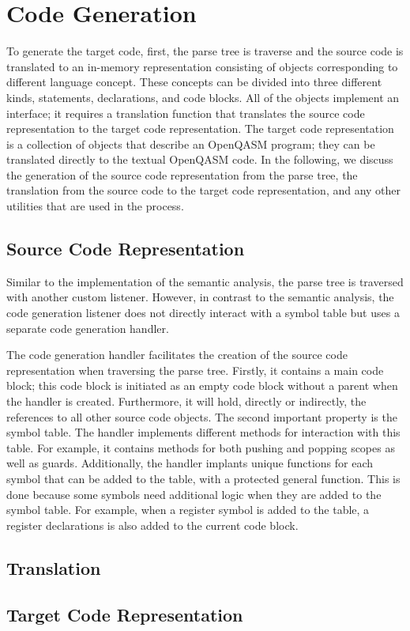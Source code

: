 \section{Code Generation}
\label{sec:implementation_codeGen}
To generate the target code, first, the parse tree is traverse and the source code is translated to an in-memory representation consisting of objects corresponding to different language concept. These concepts can be divided into three different kinds, statements, declarations, and code blocks. All of the objects implement an interface; it requires a translation function that translates the source code representation to the target code representation. The target code representation is a collection of objects that describe an OpenQASM program; they can be translated directly to the textual OpenQASM code. In the following, we discuss the generation of the source code representation from the parse tree, the translation from the source code to the target code representation, and any other utilities that are used in the process.

\subsection{Source Code Representation}
\label{sec:implementation_sourceCode}
Similar to the implementation of the semantic analysis, the parse tree is traversed with another custom listener. However, in contrast to the semantic analysis, the code generation listener does not directly interact with a symbol table but uses a separate code generation handler.

The code generation handler facilitates the creation of the source code representation when traversing the parse tree. Firstly, it contains a main code block; this code block is initiated as an empty code block without a parent when the handler is created. Furthermore, it will hold, directly or indirectly, the references to all other source code objects. The second important property is the symbol table. The handler implements different methods for interaction with this table. For example, it contains methods for both pushing and popping scopes as well as guards. Additionally, the handler implants unique functions for each symbol that can be added to the table, with a protected general function. This is done because some symbols need additional logic when they are added to the symbol table. For example, when a register symbol is added to the table, a register declarations is also added to the current code block.

\subsection{Translation}
\label{sec:implementation_translation}

\subsection{Target Code Representation}
\label{sec:implementation_targetCode}

